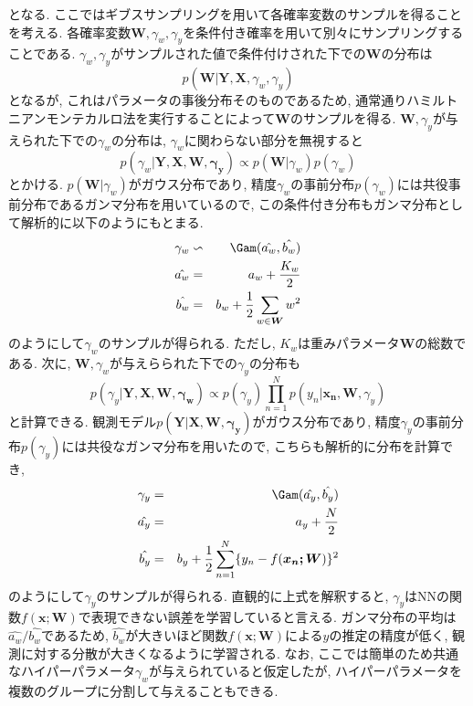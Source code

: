 \documentclass[twocolumn]{jarticle}
\begin{document}
となる. ここではギブスサンプリングを用いて各確率変数のサンプルを得ることを考える. 各確率変数${\bm {W}, \gamma_w, \gamma_y}$を条件付き確率を用いて別々にサンプリングすることである. ${\gamma_w, \gamma_y}$がサンプルされた値で条件付けされた下での${\bm {W}}$の分布は
\begin{equation}
  p(\bm {W|Y, X}, \gamma_w, \gamma_y)
\end{equation}
となるが, これはパラメータの事後分布そのものであるため, 通常通りハミルトニアンモンテカルロ法を実行することによって${\bm {W}}$のサンプルを得る. ${\bm {W}, \gamma_y}$が与えられた下での${\gamma_w}$の分布は, ${\gamma_w}$に関わらない部分を無視すると
\begin{equation}
  p(\gamma_w| \bm {Y, X, W, \gamma_y}) \varpropto p(\bm {W}|\gamma_w)p(\gamma_w)
\end{equation}
とかける. ${p(\bm {W}|\gamma_w)}$がガウス分布であり, 精度${\gamma_w}$の事前分布${p(\gamma_w)}$には共役事前分布であるガンマ分布を用いているので, この条件付き分布もガンマ分布として解析的に以下のようにもとまる.
\begin{eqnarray}
  \gamma_w &\backsim & \Gam (\hat{a_w}, \hat{b_w}) \\
  \hat{a_w} &=& a_w + \frac{K_w}{2} \\
  \hat{b_w} &=& b_w + \frac{1}{2} \sum_{w \in \bm {W}} w^2
\end{eqnarray}
のようにして${\gamma_w}$のサンプルが得られる. ただし, ${K_w}$は重みパラメータ${\bm {W}}$の総数である. 次に, ${\bm {W}, \gamma_w}$が与えらられた下での${\gamma_y}$の分布も
\begin{equation}
  p(\gamma_y|\bm {Y, X, W, \gamma_w}) \varpropto p(\gamma_y) \prod_{n=1}^{N} p(y_n|\bm {x_n, W}, \gamma_y)
\end{equation}
と計算できる. 観測モデル${p(\bm {Y|X, W, \gamma_y})}$がガウス分布であり, 精度${\gamma_y}$の事前分布${p(\gamma_y)}$には共役なガンマ分布を用いたので, こちらも解析的に分布を計算でき,
\begin{eqnarray}
  \gamma_y &=& \Gam (\hat{a_y}, \hat{b_y}) \\
  \hat {a_y} &=& a_y + \frac{N}{2} \\
  \hat {b_y} &=& b_y + \frac{1}{2} \sum_{n=1}^{N} \{y_n - f(\bm {x_n;W})\}^2
\end{eqnarray}
のようにして${\gamma_y}$のサンプルが得られる. 直観的に上式を解釈すると, ${\gamma_y}$はNNの関数${f(\bm {x;W})}$で表現できない誤差を学習していると言える. ガンマ分布の平均は${\hat {a_w} / \hat {b_w}}$であるため, ${\hat {b_w}}$が大きいほど関数${f(\bm {x;W})}$による${y}$の推定の精度が低く, 観測に対する分散が大きくなるように学習される. なお, ここでは簡単のため共通なハイパーパラメータ${\gamma_w}$が与えられていると仮定したが, ハイパーパラメータを複数のグループに分割して与えることもできる.
\end{document}
